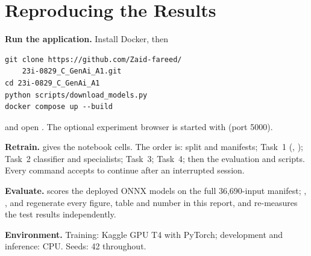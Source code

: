 \section{Reproducing the Results}\label{app:repro}
\textbf{Run the application.} Install Docker, then
\begin{verbatim}
git clone https://github.com/Zaid-fareed/
    23i-0829_C_GenAi_A1.git
cd 23i-0829_C_GenAi_A1
python scripts/download_models.py
docker compose up --build
\end{verbatim}
and open . The optional experiment browser is started with  (port 5000).

\textbf{Retrain.}  gives the notebook cells. The order is: split and manifests; Task~1 (, ); Task~2 classifier and specialists; Task~3; Task~4; then the evaluation and  scripts. Every  command accepts  to continue after an interrupted session.

\textbf{Evaluate.}  scores the deployed ONNX models on the full 36,690-input manifest; , ,  and  regenerate every figure, table and number in this report, and  re-measures the test results independently.

\textbf{Environment.} Training: Kaggle GPU T4 with PyTorch; development and inference: CPU. Seeds: 42 throughout.
